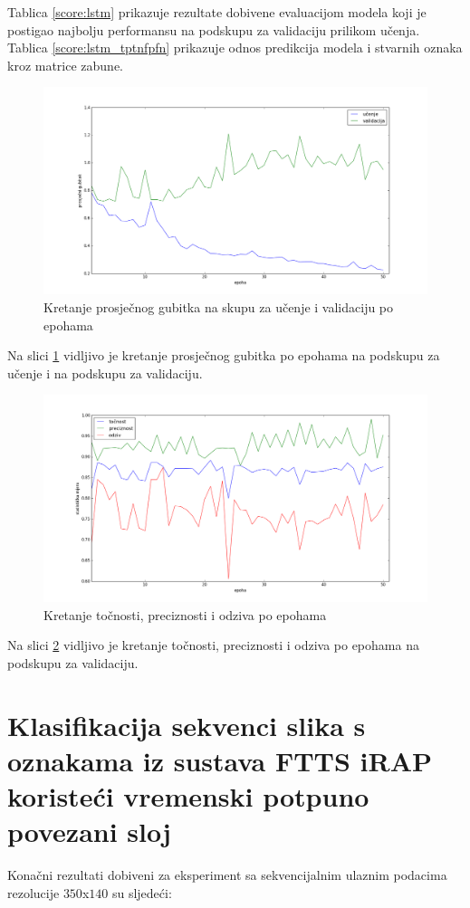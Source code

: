 \documentclass[times, utf8, diplomski, numeric]{fer}
\begin{document}
\noindent Tablica \ref{score:lstm} prikazuje rezultate dobivene evaluacijom modela koji je postigao najbolju performansu na podskupu za validaciju prilikom učenja.
Tablica \ref{score:lstm_tptnfpfn} prikazuje odnos predikcija modela i stvarnih oznaka kroz matrice zabune.

\begin{figure}[H]
\centering
\includegraphics[scale=0.35]{images/lstm_loss.png}
\caption{Kretanje prosječnog gubitka na skupu za učenje i validaciju po epohama}
\label{img:lstm_loss}
\end{figure}
\noindent Na slici \ref{img:lstm_loss} vidljivo je kretanje prosječnog gubitka po epohama na podskupu za učenje i na podskupu za validaciju.

\begin{figure}[H]
\centering
\includegraphics[scale=0.35]{images/lstm_ac_ap.png}
\caption{Kretanje točnosti, preciznosti i odziva po epohama}
\label{img:lstm_ac_ap}
\end{figure}
\noindent Na slici \ref{img:lstm_ac_ap} vidljivo je kretanje točnosti, preciznosti i odziva po epohama na podskupu za validaciju.

\section{Klasifikacija sekvenci slika s oznakama iz sustava FTTS iRAP koristeći vremenski potpuno povezani sloj}
Konačni rezultati dobiveni za eksperiment sa sekvencijalnim ulaznim podacima rezolucije $350$x$140$ su sljedeći:
\end{document}
